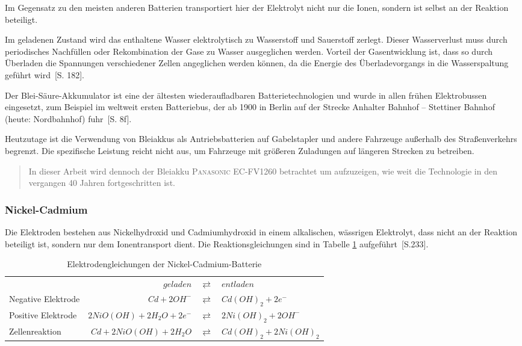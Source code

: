 Im Gegensatz zu den meisten anderen Batterien transportiert hier der Elektrolyt nicht nur die Ionen, sondern ist selbst an der Reaktion beteiligt.

Im geladenen Zustand wird das enthaltene Wasser elektrolytisch zu Wasserstoff und Sauerstoff zerlegt. Dieser Wasserverlust muss durch periodisches Nachfüllen oder Rekombination der Gase zu Wasser ausgeglichen werden. Vorteil der Gasentwicklung ist, dass so durch Überladen die Spannungen verschiedener Zellen angeglichen werden können, da die Energie des Überladevorgangs in die Wasserspaltung geführt wird~\cite{tub_aleph001746639}[S. 182].

Der Blei-Säure-Akkumulator ist eine der ältesten wiederaufladbaren Batterietechnologien und wurde in allen frühen Elektrobussen eingesetzt, zum Beispiel im weltweit ersten Batteriebus, der ab 1900 in Berlin auf der Strecke Anhalter Bahnhof – Stettiner Bahnhof (heute: Nordbahnhof) fuhr~\cite{Risch:1957}[S. 8f].

Heutzutage ist die Verwendung von Bleiakkus als Antriebsbatterien auf Gabelstapler und andere Fahrzeuge außerhalb des Straßenverkehrs begrenzt. Die spezifische Leistung reicht nicht aus, um Fahrzeuge mit größeren Zuladungen auf längeren Strecken zu betreiben.

\begin{quote}
	In dieser Arbeit wird dennoch der Bleiakku \textsc{Panasonic EC-FV1260} betrachtet um aufzuzeigen, wie weit die Technologie in den vergangen 40 Jahren fortgeschritten ist.
\end{quote}



\subsubsection{Nickel-Cadmium}
Die Elektroden bestehen aus Nickelhydroxid und Cadmiumhydroxid in einem alkalischen, wässrigen Elektrolyt, dass nicht an der Reaktion beteiligt ist, sondern nur dem Ionentransport dient. Die Reaktionsgleichungen sind in Tabelle \ref{NiCd} aufgeführt~\cite{Sterner:2014}[S.233].

\begin{table}\centering
	\begin{tabularx}{\linewidth}{XrcX}
		\toprule
		&               $geladen$ & $\rightleftarrows$ & $entladen$             \\
		Negative Elektrode &            $Cd + 2OH^-$ & $\rightleftarrows$ & $Cd(OH)_2 + 2e^-$      \\
		Positive Elektrode & $2NiO(OH) + 2H_2O + 2e^-$ & $\rightleftarrows$ & $2Ni(OH)_2 + 2OH^-$    \\ \midrule
		Zellenreaktion     &   $Cd + 2NiO(OH) + 2H_2O$ & $\rightleftarrows$ & $Cd(OH)_2 + 2Ni(OH)_2$ \\ \bottomrule
	\end{tabularx}
	\caption{Elektrodengleichungen der Nickel-Cadmium-Batterie}
	\label{NiCd}
\end{table}

